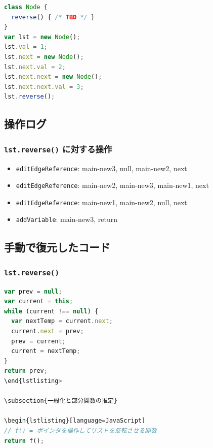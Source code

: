 \documentclass{article}
\begin{document}
\begin{lstlisting}[language=JavaScript]
class Node {
  reverse() { /* TBD */ }
}
var lst = new Node(); 
lst.val = 1;
lst.next = new Node();
lst.next.val = 2;
lst.next.next = new Node();
lst.next.next.val = 3;
lst.reverse();
\end{lstlisting}

\subsection{操作ログ}

\subsubsection{\texttt{lst.reverse()} に対する操作}
\begin{itemize}
  \item \texttt{editEdgeReference}: main-new3, null, main-new2, next
  \item \texttt{editEdgeReference}: main-new2, main-new3, main-new1, next
  \item \texttt{editEdgeReference}: main-new1, main-new2, null, next
  \item \texttt{addVariable}: main-new3, return
\end{itemize}

\subsection{手動で復元したコード}

\subsubsection{\texttt{lst.reverse()}}
\begin{lstlisting}[language=JavaScript]
var prev = null;
var current = this;
while (current !== null) {
  var nextTemp = current.next;
  current.next = prev;
  prev = current;
  current = nextTemp;
}
return prev;
\end{lstlisting>

\subsection{一般化と部分関数の推定}

\begin{lstlisting}[language=JavaScript]
// f() = ポインタを操作してリストを反転させる関数
return f();
\end{lstlisting}
\end{document}
